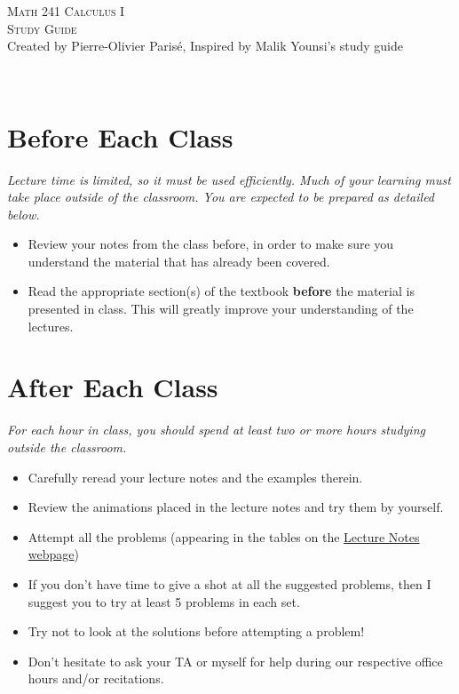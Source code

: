 \documentclass[12pt]{amsart}
\begin{document}
\thispagestyle{empty}

\noindent\hrulefill
\begin{center}
\Large{\textsc{Math 241 Calculus I} }\\
\textsc{Study Guide}\\
\small{Created by Pierre-Olivier Paris{\'e}, Inspired by Malik Younsi's study guide}
\end{center}
\hrulefill \\

\section*{Before Each Class}
\textit{Lecture time is limited, so it must be used efficiently. Much of your learning must take place outside of the classroom. You are expected to be prepared as detailed below.}
	\begin{itemize}
	\item Review your notes from the class before, in order to make sure you understand the material that has already been covered.
	\item Read the appropriate section(s) of the textbook \textbf{before} the material is presented in class. This will greatly improve your understanding of the lectures.
	\end{itemize}
	
\section*{After Each Class}
\textit{For each hour in class, you should spend at least two or more hours studying outside the classroom.}
	\begin{itemize}
	\item Carefully reread your lecture notes and the examples therein.
	\item Review the animations placed in the lecture notes and try them by yourself. 
	\item Attempt all the problems (appearing in the tables on the \href{https://mathopo.ca/courses-website/math-241/Lecture-Notes.html}{Lecture Notes webpage})
	\item If you don't have time to give a shot at all the suggested problems, then I suggest you to try at least 5 problems in each set.
	\item Try not to look at the solutions before attempting a problem!
	\item Don't hesitate to ask your TA or myself for help during our respective office hours and/or recitations.
	\end{itemize}
	
\end{document}
